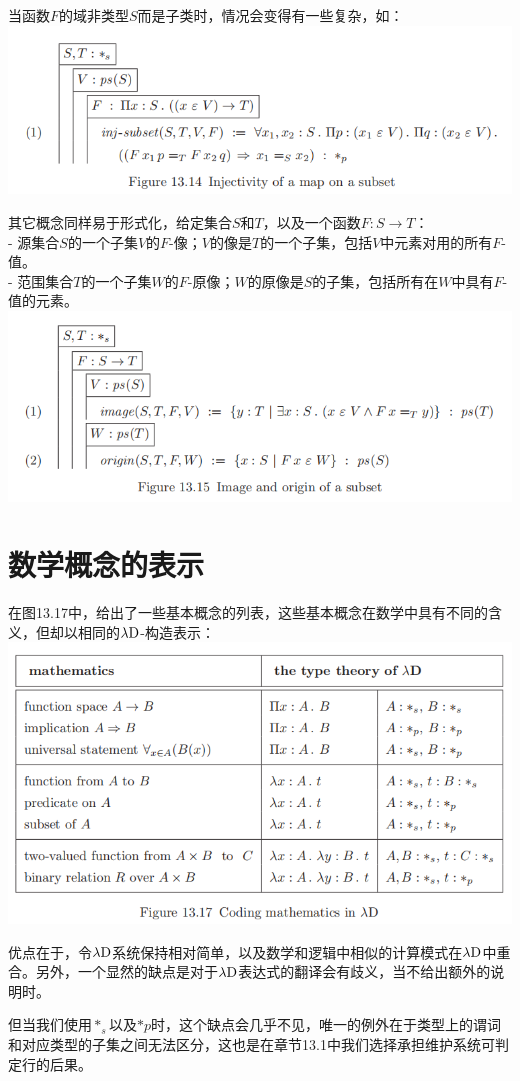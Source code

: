 \documentclass[UTF8]{article}
\begin{document}
		当函数$F$的域非类型$S$而是子类时，情况会变得有一些复杂，如：
		\includegraphics[width=0.93\linewidth]{"../imgs/13-14.png"}
		
		其它概念同样易于形式化，给定集合$S$和$T$，以及一个函数$F:S\rightarrow T$：\\
		- 源集合$S$的一个子集$V$的$F$-像；$V$的像是$T$的一个子集，包括$V$中元素对用的所有$F$-值。\\
		- 范围集合$T$的一个子集$W$的$F$-原像；$W$的原像是$S$的子集，包括所有在$W$中具有$F$-值的元素。\\
		\includegraphics[width=0.93\linewidth]{"../imgs/13-15.png"}
		
	\section{数学概念的表示}
	\noindent
	在图13.17中，给出了一些基本概念的列表，这些基本概念在数学中具有不同的含义，但却以相同的$\lambda{\rm D}$-构造表示：\\
	\includegraphics[width=0.93\linewidth]{"../imgs/13-16.png"}
	
		优点在于，令$\lambda{\rm D}$系统保持相对简单，以及数学和逻辑中相似的计算模式在$\lambda{\rm D}$中重合。另外，一个显然的缺点是对于$\lambda{\rm D}$表达式的翻译会有歧义，当不给出额外的说明时。
		
		但当我们使用$*_s$以及$*p$时，这个缺点会几乎不见，唯一的例外在于类型上的谓词和对应类型的子集之间无法区分，这也是在章节13.1中我们选择承担维护系统可判定行的后果。
\end{document}
